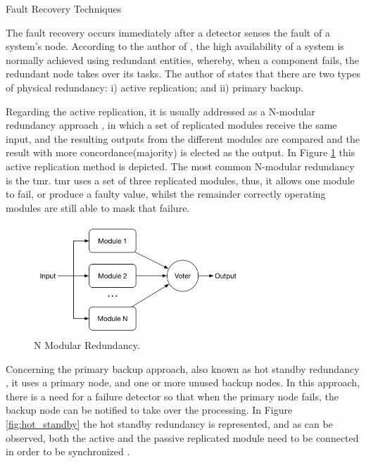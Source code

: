 \begin{Paragraph}{Fault Recovery Techniques}
	
	The fault recovery occurs immediately after a detector senses the fault of a system’s node. According to the author of \cite{Schweiz}, the high availability of a system is normally achieved using redundant entities, whereby, when a component fails, the redundant node takes over its tasks. The author of \cite{Redwine} states that there are two types of physical redundancy: i) active replication; and ii) primary backup.
	
	Regarding the active replication, it is usually addressed as a N-modular redundancy approach \cite{Schweiz}, in which a set of replicated modules receive the same input, and the resulting outputs from the different modules are compared and the result with more concordance(majority) is elected as the output. In Figure \ref{fig:nmodular} this active replication method is depicted. The most common N-modular redundancy is the \acf{tmr}. \ac{tmr} uses a set of three replicated modules, thus, it allows one module to fail, or produce a faulty value, whilst the remainder correctly operating modules are still able to mask that failure.
	
	\begin{figure}[H]
		\centering
		\includegraphics[width=0.7\textwidth]{figures/nmodular.png}
		\caption{N Modular Redundancy.}
		\label{fig:nmodular}
	\end{figure}
	
	Concerning the primary backup approach, also known as hot standby redundancy \cite{Schweiz}, it uses a primary node, and one or more unused backup nodes. In this approach, there is a need for a failure detector so that when the primary node fails, the backup node can be notified to take over the processing. In Figure \ref{fig:hot_standby} the hot standby redundancy is represented, and as can be observed, both the active and the passive replicated module need to be connected in order to be synchronized \cite{Schweiz}. 
	

\end{Paragraph}
